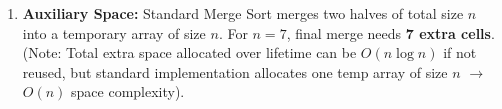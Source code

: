 \documentclass[11pt]{article}
\begin{document}
\begin{exoresolu}
\begin{enumerate}
\begin{center}
            \end{center}
            \textbf{Merge Phase (Bottom-Up):}
            \begin{itemize}
                \item Merge $[38],[27] \rightarrow [27,38]$
                \item Merge $[43],[3] \rightarrow [3,43]$
                \item Merge $[27,38],[3,43] \rightarrow [3,27,38,43]$
                \item Merge $[82],[10] \rightarrow [10,82]$
                \item Merge $[9],[10,82] \rightarrow [9,10,82]$
                \item Merge $[3,27,38,43],[9,10,82] \rightarrow [3,9,10,27,38,43,82]$
            \end{itemize}
        \item \textbf{Auxiliary Space:} Standard Merge Sort merges two halves of total size $n$ into a temporary array of size $n$.
            For $n=7$, final merge needs \textbf{7 extra cells}.
            (Note: Total extra space allocated over lifetime can be $O(n \log n)$ if not reused, but standard implementation allocates one temp array of size $n$ $\rightarrow$ $O(n)$ space complexity).
    \end{enumerate}
\end{exoresolu}
\end{document}
